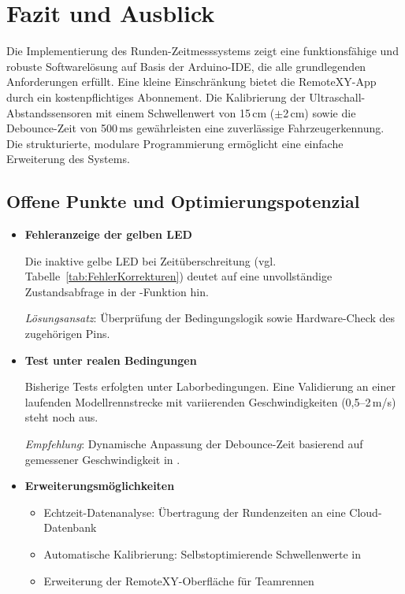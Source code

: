 \section{Fazit und Ausblick}
\label{sec:fazit}

Die Implementierung des Runden-Zeitmesssystems zeigt eine funktionsfähige und robuste Softwarelösung auf Basis der Arduino-IDE, die alle grundlegenden Anforderungen erfüllt. Eine kleine Einschränkung bietet die RemoteXY-App durch ein kostenpflichtiges Abonnement. Die Kalibrierung der Ultraschall-Abstandssensoren mit einem Schwellenwert von 15\,cm ($\pm$2\,cm) sowie die Debounce-Zeit von 500\,ms gewährleisten eine zuverlässige Fahrzeugerkennung. Die strukturierte, modulare Programmierung ermöglicht eine einfache Erweiterung des Systems. 

\subsection{Offene Punkte und Optimierungspotenzial}

\begin{itemize}
	\item \textbf{Fehleranzeige der gelben LED} 
	
	Die inaktive gelbe LED bei Zeitüberschreitung (vgl. Tabelle~\ref{tab:FehlerKorrekturen}) deutet auf eine unvollständige Zustandsabfrage in der -Funktion hin. 
	
	\textit{Lösungsansatz}: Überprüfung der Bedingungslogik  sowie Hardware-Check des zugehörigen Pins.
	
	\item \textbf{Test unter realen Bedingungen} 
	
	Bisherige Tests erfolgten unter Laborbedingungen. Eine Validierung an einer laufenden Modellrennstrecke mit variierenden Geschwindigkeiten (0,5--2\,m/s) steht noch aus. 
	
	\textit{Empfehlung}: Dynamische Anpassung der Debounce-Zeit basierend auf gemessener Geschwindigkeit in .
	
	\item \textbf{Erweiterungsmöglichkeiten} 
	
	\begin{itemize}
		\item Echtzeit-Datenanalyse: Übertragung der Rundenzeiten an eine Cloud-Datenbank
		\item Automatische Kalibrierung: Selbstoptimierende Schwellenwerte in 
		\item Erweiterung der RemoteXY-Oberfläche für Teamrennen
	\end{itemize}
\end{itemize}

